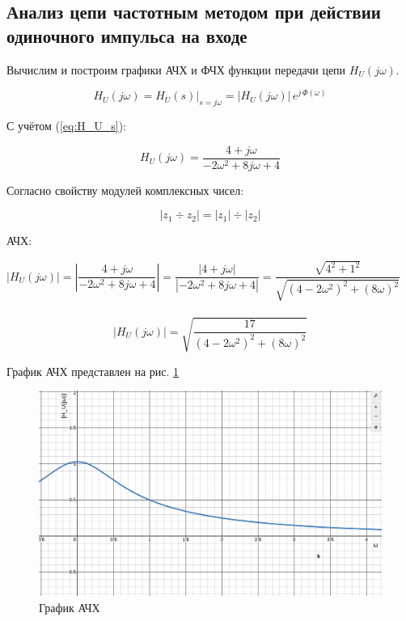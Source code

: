 \subsection{Анализ цепи частотным методом при действии одиночного импульса на входе}

\newcommand{\abs}[1]{\left| #1 \right|}

Вычислим и построим 
графики АЧХ и ФЧХ функции передачи цепи 
$ H_U(j\omega) $.

$$ H_U(j\omega) = 
\left. H_U(s) \right|_{s = j\omega} =
\left| H_U(j\omega) \right|\,e^{j\,\Phi(\omega)}
$$

С учётом (\ref{eq:H_U_s}):

\begin{equation}\label{eq:H_U_j_omega}
H_U(j\omega) = 
\dfrac{4 + j\omega}{-2\omega^2 + 8j\omega + 4}
\end{equation}

Согласно свойству модулей комплексных чисел:

$$ |z_{1} \div z_{2}| = |z_{1}| \div |z_{2}| $$

АЧХ:

$
\abs{H_U(j\omega)} = 
\abs{\dfrac{4 + j\omega}{-2\omega^2 + 8j\omega + 4}} =
\dfrac{\abs{4 + j\omega}}{\abs{-2\omega^2 + 8j\omega + 4}} =
\dfrac{\sqrt{4^2+1^2}}{\sqrt{(4-2\omega^2)^2 + (8\omega)^2}}
$\\\\

\begin{equation}\label{eq:ach}
    \abs{H_U(j\omega)} = 
    \sqrt{\dfrac{17}{(4-2\omega^2)^2 + (8\omega)^2}}
\end{equation}

График АЧХ представлен на рис. \ref{fig:ach}

\begin{figure}[H]
    \centering
    \includegraphics[width=0.7\linewidth]{photo/ach}
    \caption{График АЧХ}
    \label{fig:ach}
\end{figure}

